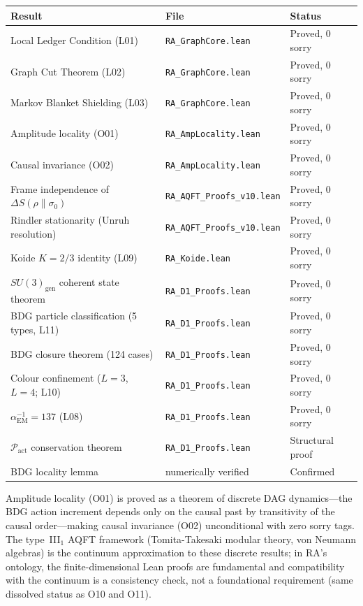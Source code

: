 \documentclass[11pt,a4paper]{article}
\newcommand{\Pact}{\mathcal{P}_{\mathrm{act}}}
\begin{document}
\begin{center}
\renewcommand{\arraystretch}{1.2}
\begin{tabular}{p{5.5cm}p{4cm}p{2.5cm}}
\toprule
Result & File & Status \\
\midrule
Local Ledger Condition (L01) & \texttt{RA\_GraphCore.lean} & Proved, 0 sorry \\
Graph Cut Theorem (L02) & \texttt{RA\_GraphCore.lean} & Proved, 0 sorry \\
Markov Blanket Shielding (L03) & \texttt{RA\_GraphCore.lean} & Proved, 0 sorry \\
Amplitude locality (O01) & \texttt{RA\_AmpLocality.lean} & Proved, 0 sorry \\
Causal invariance (O02) & \texttt{RA\_AmpLocality.lean} & Proved, 0 sorry \\
Frame independence of $\Delta S(\rho\|\sigma_0)$ & \texttt{RA\_AQFT\_Proofs\_v10.lean} & Proved, 0 sorry \\
Rindler stationarity (Unruh resolution) & \texttt{RA\_AQFT\_Proofs\_v10.lean} & Proved, 0 sorry \\
Koide $K = 2/3$ identity (L09) & \texttt{RA\_Koide.lean} & Proved, 0 sorry \\
$SU(3)_{\mathrm{gen}}$ coherent state theorem & \texttt{RA\_D1\_Proofs.lean} & Proved, 0 sorry \\
BDG particle classification (5 types, L11) & \texttt{RA\_D1\_Proofs.lean} & Proved, 0 sorry \\
BDG closure theorem (124 cases) & \texttt{RA\_D1\_Proofs.lean} & Proved, 0 sorry \\
Colour confinement ($L{=}3$, $L{=}4$; L10) & \texttt{RA\_D1\_Proofs.lean} & Proved, 0 sorry \\
$\alpha_{\mathrm{EM}}^{-1} = 137$ (L08) & \texttt{RA\_D1\_Proofs.lean} & Proved, 0 sorry \\
$\Pact$ conservation theorem & \texttt{RA\_D1\_Proofs.lean} & Structural proof \\
BDG locality lemma & numerically verified & Confirmed \\
\bottomrule
\end{tabular}
\end{center}

\noindent
Amplitude locality (O01) is proved as a theorem of discrete DAG
dynamics---the BDG action increment depends only on the causal past
by transitivity of the causal order---making causal invariance (O02)
unconditional with zero sorry tags. The type~III$_1$ AQFT framework
(Tomita-Takesaki modular theory, von Neumann algebras) is the continuum
approximation to these discrete results; in RA's ontology, the
finite-dimensional Lean proofs are fundamental and compatibility with
the continuum is a consistency check, not a foundational requirement
(same dissolved status as O10 and O11).
\end{document}
